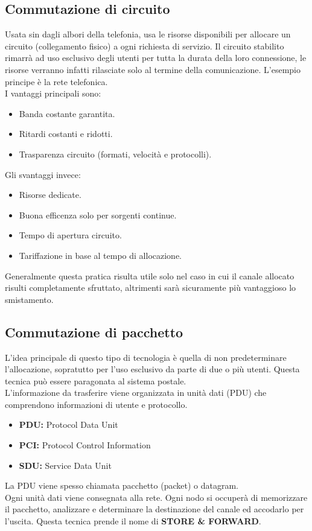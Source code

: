 \documentclass[12pt]{article}
\begin{document}
\subsection{Commutazione di circuito}
Usata sin dagli albori della telefonia, usa le risorse disponibili per allocare un circuito (collegamento fisico) a ogni richiesta di servizio. Il circuito stabilito rimarrà ad uso esclusivo degli utenti per tutta la durata della loro connessione, le risorse verranno infatti rilasciate solo al termine della comunicazione. L'esempio principe è la rete telefonica.\\
I vantaggi principali sono:
\begin{itemize}
  \item Banda costante garantita.
  \item Ritardi costanti e ridotti.
  \item Trasparenza circuito (formati, velocità e protocolli).
\end{itemize}
Gli svantaggi invece:
\begin{itemize}
  \item Risorse dedicate.
  \item Buona efficenza solo per sorgenti continue.
  \item Tempo di apertura circuito.
  \item Tariffazione in base al tempo di allocazione.
\end{itemize}
Generalmente questa pratica risulta utile solo nel caso in cui il canale allocato risulti completamente sfruttato, altrimenti sarà sicuramente più vantaggioso lo smistamento.

\subsection{Commutazione di pacchetto}
L'idea principale di questo tipo di tecnologia è quella di non predeterminare l'allocazione, sopratutto per l'uso esclusivo da parte di due o più utenti. Questa tecnica può essere paragonata al sistema postale.\\
L'informazione da trasferire viene organizzata in unità dati (PDU) che comprendono informazioni di utente e protocollo.
\begin{itemize}
  \item \textbf{PDU:} Protocol Data Unit
  \item \textbf{PCI:} Protocol Control Information
  \item \textbf{SDU:} Service Data Unit
\end{itemize}
La PDU viene spesso chiamata pacchetto (packet) o datagram.\\
Ogni unità dati viene consegnata alla rete. Ogni nodo si occuperà di memorizzare il pacchetto, analizzare e determinare la destinazione del canale ed accodarlo per l'uscita. Questa tecnica prende il nome di \textbf{STORE \& FORWARD}.
\end{document}
